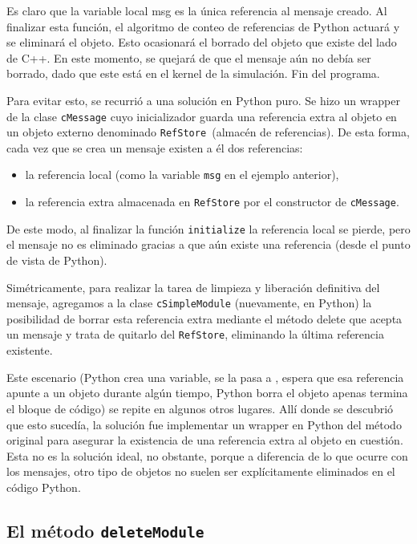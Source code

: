 \inputminted{Python}{codelistings/txc1.py}

Es claro que la variable local msg es la única referencia al mensaje creado. Al
finalizar esta función, el algoritmo de conteo de referencias de Python actuará
y se eliminará el objeto. Esto ocasionará el borrado del objeto que existe del
lado de C++. En este momento, \omnetpp{} se quejará de que el mensaje aún no debía
ser borrado, dado que este está en el kernel de la simulación. Fin del
programa.

Para evitar esto, se recurrió a una solución en Python puro. Se hizo un wrapper
de la clase \verb!cMessage! cuyo inicializador guarda una referencia extra al objeto
en un objeto externo denominado \verb!RefStore !(almacén de referencias). De esta
forma, cada vez que se crea un mensaje existen a él dos referencias:

\begin{itemize}
    \item la referencia local (como la variable \verb!msg! en el ejemplo
anterior),

    \item la referencia extra almacenada en \verb!RefStore! por el constructor
de \verb!cMessage!.
\end{itemize}

De este modo, al finalizar la función \verb!initialize! la referencia local se
pierde, pero el mensaje no es eliminado gracias a que aún existe una referencia
(desde el punto de vista de Python). 

Simétricamente, para realizar la tarea de limpieza y liberación definitiva del
mensaje, agregamos a la clase \verb!cSimpleModule! (nuevamente, en Python) la
posibilidad de borrar esta referencia extra mediante el método delete que
acepta un mensaje y trata de quitarlo del \verb!RefStore!, eliminando la última
referencia existente.

Este escenario (Python crea una variable, se la pasa a \omnetpp{}, \omnetpp{}
espera que esa referencia apunte a un objeto durante algún tiempo, Python borra
el objeto apenas termina el bloque de código) se repite en algunos otros
lugares. Allí donde se descubrió que esto sucedía, la solución fue implementar
un wrapper en Python del método original para asegurar la existencia de una
referencia extra al objeto en cuestión. Esta no es la solución ideal, no
obstante, porque a diferencia de lo que ocurre con los mensajes, otro tipo de
objetos no suelen ser explícitamente eliminados en el código Python.

\subsection{El método \texttt{deleteModule}}

